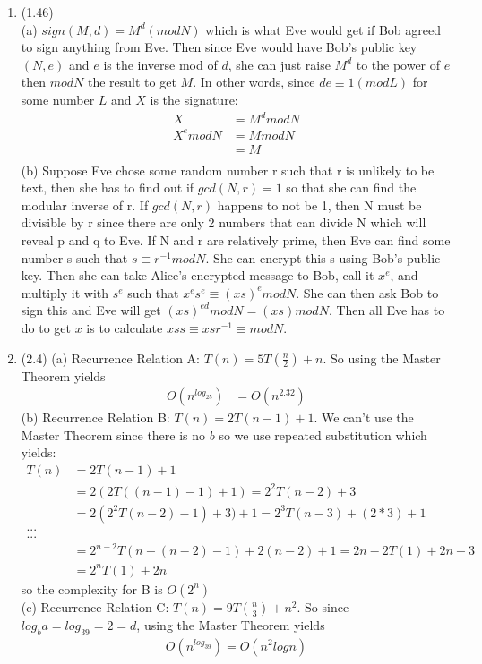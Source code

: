\documentclass{article}
\begin{document}
\begin{enumerate}
		\item 
			(1.46)
			\\
			(a) $sign(M,d) = M^d(modN)$ which is what Eve would get if Bob agreed to sign anything from Eve. Then since Eve would have Bob's public key $(N,e)$ and $e$ is the inverse mod of $d$, she can just raise $M^d$ to the power of $e$ then $modN$ the result to get $M$. In other words, since $de \equiv1(mod{L})$ for some number $L$ and $X$ is the signature:
			\begin{align*}
				 X &= M^dmodN \\
				X^emodN &= MmodN \\
				&= M \\
			\end{align*}
			(b) Suppose Eve chose some random number r such that r is unlikely to be text, then she has to find out if $gcd(N, r) = 1$ so that she can find the modular inverse of r. If $gcd(N, r)$ happens to not be 1, then N must be divisible by r since there are only 2 numbers that can divide N which will reveal p and q to Eve. If N and r are relatively prime, then Eve can find some number s such that $s \equiv r^{-1} modN$. She can encrypt this s using Bob's public key. Then she can take Alice's encrypted message to Bob, call it $x^e$, and multiply it with $s^e$ such that $x^es^e \equiv (xs)^emodN$. She can then ask Bob to sign this and Eve will get $(xs)^{ed}modN = (xs)modN$. Then all Eve has to do to get $x$ is to calculate $xss \equiv xsr^{-1} \equiv modN$.
			\\
			
		\item
			(2.4) (a) Recurrence Relation A: $T(n) = 5T(\frac{n}{2}) + n$. So using the Master Theorem yields
			\begin{align*}
			O(n^{log_25}) &= O(n^{2.32})
			\end{align*}
			(b) Recurrence Relation B: $T(n) = 2T(n-1) + 1$. We can't use the Master Theorem since there is no $b$ so we use repeated substitution which yields:
			\begin{align*}
				T(n) &= 2T(n-1) + 1 \\
				&= 2(2T((n-1)-1)+1) = 2^2T(n-2) + 3 \\
				&= 2(2^2T(n-2)-1)+3)+1 = 2^3T(n-3) + (2*3) + 1 \\
				... \\
				... \\
				&= 2^{n-2}T(n-(n-2)-1)+2(n-2)+1=2{n-2}T(1)+2n-3 \\
				&=2^nT(1)+2n
			\end{align*}
			so the complexity for B is $O(2^n)$\\
			(c) Recurrence Relation C: $T(n) = 9T(\frac{n}{3}) + n^2$. So since $log_ba = log_39 = 2 = d$, using the Master Theorem yields
			\begin{align*}
			O(n^{log_39}) = O(n^{2}logn)
			\end{align*}


\end{enumerate}
\end{document}
